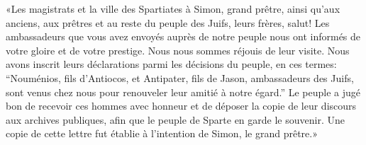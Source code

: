 «Les magistrats et la ville des Spartiates
	à Simon, grand prêtre, ainsi qu’aux anciens, aux prêtres
		et au reste du peuple des Juifs, leurs frères, salut!
Les ambassadeurs que vous avez envoyés auprès de notre peuple
	nous ont informés de votre gloire et de votre prestige.
	Nous nous sommes réjouis de leur visite.
Nous avons inscrit leurs déclarations parmi les décisions du peuple, en ces termes:
	“Nouménios, fils d’Antiocos, et Antipater, fils de Jason, ambassadeurs des Juifs,
	sont venus chez nous pour renouveler leur amitié à notre égard.”
Le peuple a jugé bon de recevoir ces hommes avec honneur
	et de déposer la copie de leur discours aux archives publiques,
	afin que le peuple de Sparte en garde le souvenir.
Une copie de cette lettre fut établie à l’intention de Simon, le grand prêtre.»
